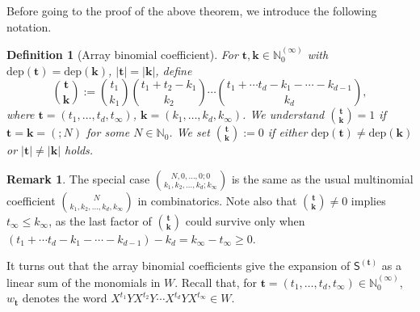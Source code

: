 \documentclass[10pt]{article}
\newtheorem{Definition}[Theorem]{Definition}
\theoremstyle{definition}
\newtheorem{Remark}[Theorem]{Remark}
\theoremstyle{remark}
\def\bk{{\mathbf{k}}}
\def\SS{{\mathsf{S}}}
\def\dep{\mathrm{dep}}
\def\bt{{\mathbf{t}}}
\def\N{{\mathbb N}}
\begin{document}
Before going to the proof of the above theorem, we introduce the following
notation.

\begin{Definition}[Array binomial coefficient]
For $\bt,\bk\in  \N_0^{(\infty)}$ with $\dep(\bt)=\dep(\bk)$, 
$|\bt|=|\bk|$, define
\begin{equation} \label{ArrayBino}
\binom{\bt}{\bk}:=
\binom{t_1}{k_1}
\binom{t_1+t_2-k_1}{k_2}
\cdots
\binom{t_1+\cdots t_d-k_1-\cdots-k_{d-1}}{k_d},
\end{equation}
where $\bt=(t_1,\dots,t_d,t_\infty)$,
$\bk=(k_1,\dots,k_d,k_\infty)$.
We understand $\binom{\bt}{\bk}=1$ if
$\bt=\bk=(;N)$ for some $N\in \N_0$.
We set $\binom{\bt}{\bk}:=0$ if either $\dep(\bt)\ne\dep(\bk)$ or 
$|\bt|\ne|\bk|$ holds.
\end{Definition}

\begin{Remark} 
\label{rem2.6}
The special case $\binom{N,0,\dots,0;0}{k_1,k_2,\dots,k_d;k_\infty}$ 
is the same as the usual multinomial coefficient 
$\binom{N}{k_1,k_2,\dots,k_d,k_\infty}$ in combinatorics.
Note also that $\binom{\bt}{\bk}\ne 0$ implies $t_\infty\le k_\infty$,
as the last factor of $\binom{\bt}{\bk}$ could survive only when 
$(t_1+\cdots t_d-k_1-\cdots-k_{d-1})-k_d=k_\infty-t_\infty\ge 0$.
\end{Remark}

It turns out that the array binomial coefficients give
the expansion of $\SS^{(\bt)}$ as a linear sum of the monomials in $W$.
Recall that, for $\bt=(t_1,\dots,t_d,t_\infty)\in  \N_0^{(\infty)}$, 
$w_\bt$ denotes the word $X^{t_1}YX^{t_2}Y\cdots X^{t_d}YX^{t_\infty}\in W$.
\end{document}
